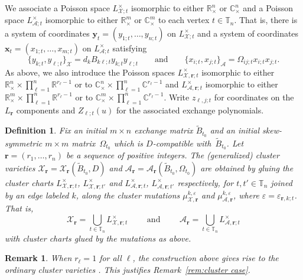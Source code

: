 \documentclass{amsart}
\newtheorem{definition}[theorem]{Definition}
\newtheorem{remark}[theorem]{Remark}
\numberwithin{equation}{section}
\newcommand{\bfr}{{\boldsymbol{r}}}
\newcommand{\bfx}{{\boldsymbol{x}}}
\newcommand{\bfy}{{\boldsymbol{y}}}
\newcommand{\cA}{\mathcal{A}}
\newcommand{\cX}{\mathcal{X}}
\newcommand{\CC}{\mathbb{C}}
\newcommand{\RR}{\mathbb{R}}
\newcommand{\TT}{\mathbb{T}}
\begin{document}
We associate a Poisson space $L^\times_{\cX;t}$ isomorphic to either $\RR_\times^n$ or $\CC_\times^n$ and a Poisson space $L^\times_{\cA;t}$ isomorphic to either $\RR_\times^m$ or $\CC_\times^m$ to each vertex $t\in\TT_n$.
That is, there is a system of coordinates $\bfy_t=(y_{1;t},\ldots,y_{n;t})$ on $L^\times_{\cX;t}$ and a system of coordinates $\bfx_t=(x_{1;t},\ldots,x_{m;t})$ on $L^\times_{\cA;t}$ satisfying
\begin{equation*}
  \{y_{k;t},y_{\ell;t}\}_\cX=d_kB_{k\ell;t}y_{k;t}y_{\ell;t}\qquad\text{and}\qquad\{x_{i;t},x_{j;t}\}_\cA=\Omega_{ij;t}x_{i;t}x_{j;t}.
\end{equation*}
As above, we also introduce the Poisson spaces $L^\times_{\cX,\bfr;t}$ isomorphic to either $\RR_\times^n\times\prod_{\ell=1}^n \RR^{r_\ell-1}$ or to $\CC_\times^n\times\prod_{\ell=1}^n \CC^{r_\ell-1}$ and $L^\times_{\cA,\bfr;t}$ isomorphic to either $\RR_\times^m\times\prod_{\ell=1}^n \RR^{r_\ell-1}$ or to $\CC_\times^m\times\prod_{\ell=1}^n \CC^{r_\ell-1}$.
Write $z_{\ell,j;t}$ for coordinates on the $L_\bfr$ components and $Z_{\ell;t}(u)$ for the associated exchange polynomials.
\begin{definition}
  \label{def:cluster varieties}
  Fix an initial $m\times n$ exchange matrix $\tilde B_{t_0}$ and an initial skew-symmetric $m\times m$ matrix~$\Omega_{t_0}$ which is $D$-compatible with~$\tilde B_{t_0}$.
  Let $\bfr=(r_1,\ldots,r_n)$ be a sequence of positive integers.
  The \emph{(generalized) cluster varieties} $\cX_\bfr=\cX_\bfr(\tilde B_{t_0},D)$ and $\cA_\bfr=\cA_\bfr(\tilde B_{t_0},\Omega_{t_0})$ are obtained by gluing the cluster charts $L^\times_{\cX,\bfr;t}$, $L^\times_{\cX,\bfr;t'}$ and $L^\times_{\cA,\bfr;t}$, $L^\times_{\cA,\bfr;t'}$ respectively, for $t,t'\in\TT_n$ joined by an edge labeled $k$, along the cluster mutations $\mu_{\cX,\bfr}^{k,\varepsilon}$ and $\mu_{\cA,\bfr}^{k,\varepsilon}$, where $\varepsilon=\varepsilon_{\bfr,k;t}$.
  That is, 
  \begin{equation*}
    \cX_\bfr=\bigcup_{t\in\TT_n} L^\times_{\cX,\bfr;t}\qquad\text{ and }\qquad\cA_\bfr=\bigcup_{t\in\TT_n} L^\times_{\cA,\bfr;t}
  \end{equation*}
  with cluster charts glued by the mutations as above.
\end{definition}
\begin{remark}
  \label{rem:cluster case 2}
  When $r_\ell=1$ for all $\ell$, the construction above gives rise to the ordinary cluster varieties \cite{FZ02,FG09a}.
  This justifies Remark~\ref{rem:cluster case}.
\end{remark}
\end{document}
